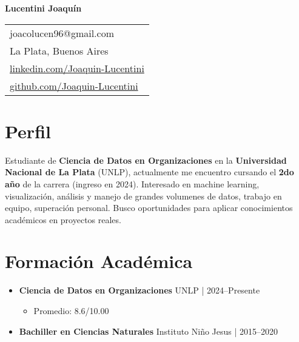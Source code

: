 \documentclass[11pt, a4paper]{article}
\newcommand{\cvitem}[2]{\textbf{#1} \hfill \color{secondary}#2} %
\begin{document}
\begin{center}
    {\Huge \textbf{Lucentini Joaquín}} \\[15pt]
    
    \noindent
    \begin{tabular}{@{} l @{}}
    \faEnvelope{} joacolucen96@gmail.com \\
    \faMapMarker{} La Plata, Buenos Aires \\
    \faLinkedin{} \href{https://www.linkedin.com/in/joaquin-lucentini-a48066277/}{linkedin.com/Joaquin-Lucentini} \\
    \faGithub{} \href{https://github.com/JoacoLucen}{github.com/Joaquin-Lucentini}
    \end{tabular}
\end{center}

\section*{Perfil}
Estudiante de \textbf{Ciencia de Datos en Organizaciones} en la \textbf{Universidad Nacional de La Plata} (UNLP), actualmente me encuentro cursando el \textbf{2do año} de la carrera (ingreso en 2024). Interesado en machine learning, visualización, análisis y manejo de grandes volumenes de datos, trabajo en equipo, superación personal. Busco oportunidades para aplicar conocimientos académicos en proyectos reales.

\section*{Formación Académica}
\begin{itemize}[leftmargin=*]
    \item \cvitem{Ciencia de Datos en Organizaciones}{UNLP | 2024--Presente}
    \begin{itemize}
        \item Promedio: 8.6/10.00
    \end{itemize}
    \item \cvitem{Bachiller en Ciencias Naturales}{Instituto Niño Jesus | 2015--2020}
\end{itemize}

\end{document}
